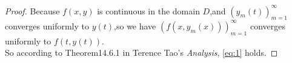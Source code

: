 \documentclass[a4paper, 12pt]{article} %
\begin{document}
\begin{CJK}{UTF8}{gkai}
\begin{proof}
Because $f(x,y)$ is continuous in the domain $D$,and $(y_m(t))_{m=1}^{\infty}$
converges uniformly to $y(t)$,so we have $(f(x,y_m(x)))_{m=1}^{\infty}$ converges
uniformly to $f(t,y(t))$.\\

So according to Theorem14.6.1 in Terence Tao's \textit{Analysis}, \eqref{eq:1} holds.
\end{proof}  


  \end{CJK}
\end{document}
